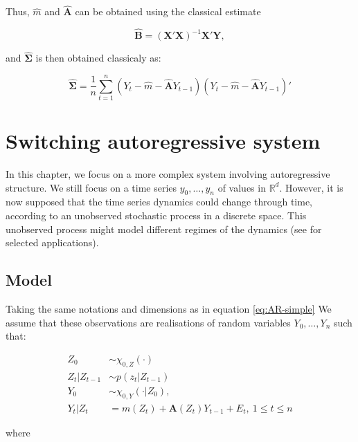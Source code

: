 \documentclass[]{book}
\begin{document}
Thus, \(\hat{m}\) and \(\hat{\mathbf{A}}\) can be obtained using the
classical estimate

\begin{equation}
\hat{\mathbf{B}} = \left(\mathbf{X'X}\right)^{-1}\mathbf{X}'\mathbf{Y}, \label{eq:AR-simple-B-hat}
\end{equation}

and \(\hat{\mathbf{\Sigma}}\) is then obtained classicaly as:

\begin{equation}
\hat{\mathbf{\Sigma}} = \frac{1}{n} \sum_{t = 1}^n \left(Y_t - \hat{m} - \hat{\mathbf{A}} Y_{t - 1}\right) \left(Y_t - \hat{m} - \hat{\mathbf{A}} Y_{t - 1}\right)' \label{eq:AR-simple-Sigma-hat}
\end{equation}

\chapter{Switching autoregressive
system}\label{switching-autoregressive-system}

In this chapter, we focus on a more complex system involving
autoregressive structure. We still focus on a time series
\(y_0, \dots, y_n\) of values in \(\mathbb{R}^d\). However, it is now
supposed that the time series dynamics could change through time,
according to an unobserved stochastic process in a discrete space. This
unobserved process might model different regimes of the dynamics (see
\citet{rabiner1989tutorial} for selected applications).

\section{Model}\label{model-1}

Taking the same notations and dimensions as in equation
\eqref{eq:AR-simple} We assume that these observations are realisations of
random variables \(Y_0,\dots, Y_n\) such that:

\begin{align*}
Z_0 &\sim \chi_{0, Z}(\cdot)\\
Z_t \vert Z_{t - 1} &\sim p(z_t \vert Z_{t - 1}) \\
Y_0 &\sim \chi_{0, Y}(\cdot \vert Z_0), \\
Y_t \vert Z_t &= m(Z_t) + \mathbf{A}(Z_t)Y_{t -1} + E_t,~1\leq t \leq n 
\end{align*}

where
\end{document}
